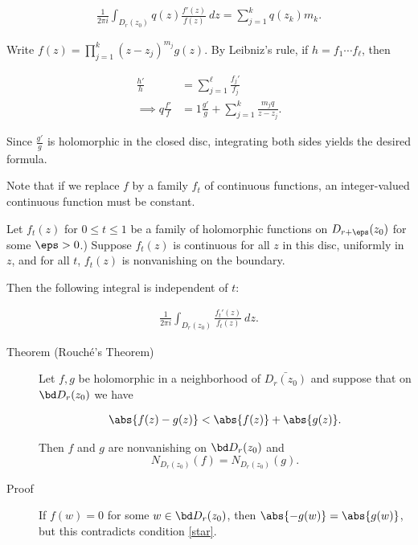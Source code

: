 \begin{align*}
  \frac 1 {2\pi i } \int_{D_r(z_0)} q(z) \frac{f'(z)}{f(z)} ~dz
  = \sum_{j=1}^k q(z_k) m_k
  .\end{align*}

\begin{description}
\tightlist
\item[Proof]
Write \(f(z) = \prod_{j=1}^k (z-z_j)^{m_j} g(z)\). By Leibniz's rule, if
\(h = f_1 \cdots f_\ell\), then
\end{description}

\begin{align*}
  \frac {h'} h
  &= \sum_{j=1}^\ell \frac {f_j'} {f_j} \\
  \implies q\frac {f'} f &= 1\frac {g'} g + \sum_{j=1}^k \frac{m_j q}{z-z_j}
  .\end{align*}

Since \(\frac {g'} g\) is holomorphic in the closed disc, integrating
both sides yields the desired formula.

Note that if we replace \(f\) by a family \(f_t\) of continuous
functions, an integer-valued continuous function must be constant.

\begin{description}
\tightlist
\item[Corollary]
Let \(f_t(z)\) for \(0\leq t \leq 1\) be a family of holomorphic
functions on \(D_{r+\eps}(z_0)\) for some \(\eps > 0\).) Suppose
\(f_t(z)\) is continuous for all \(z\) in this disc, uniformly in \(z\),
and for all \(t\), \(f_t(z)\) is nonvanishing on the boundary.
\end{description}

Then the following integral is independent of \(t\):

\begin{align*}
    \frac 1 {2\pi i } \int_{D_r(z_0)} \frac{f_t'(z)}{f_t(z)} ~dz
  .\end{align*}

\begin{description}
\item[Theorem (Rouché's Theorem)]
Let \(f, g\) be holomorphic in a neighborhood of \(\bar{D_r(z_0)}\) and
suppose that on \(\bd D_r(z_0)\) we have

\begin{align*}\label{star}
\abs{f(z) - g(z)} < \abs{f(z)} + \abs{g(z)}
.\end{align*}

Then \(f\) and \(g\) are nonvanishing on \(\bd D_r(z_0)\) and
\begin{equation}
N_{D_r(z_0)} (f) =
N_{D_r(z_0)} (g)
.\end{equation}
\item[Proof]
If \(f(w) = 0\) for some \(w\in \bd D_r(z_0)\), then
\(\abs{-g(w)} = \abs{g(w)}\), but this contradicts condition \ref{star}.
\end{description}

